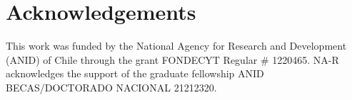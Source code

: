 \documentclass[preprint,3p,12pt,number,sort&compress]{elsarticle}
\newcommand{\pd}[2]{\frac{\partial #1}{ \partial #2}}   %
\newcommand{\pddc}[3]{\frac{\partial^2 #1}{ \partial #2 \partial #3}}   %
\def\vec   #1{\text{\boldmath $#1$}{}}
\def\ten   #1{\text{\boldmath $#1$}{}}
\begin{document}
\section*{Acknowledgements}
This work was funded by the National Agency for Research and Development (ANID) of Chile through the grant FONDECYT Regular \# 1220465. NA-R acknowledges the support of the graduate fellowship ANID BECAS/DOCTORADO NACIONAL 21212320.





%
%


\end{document}
